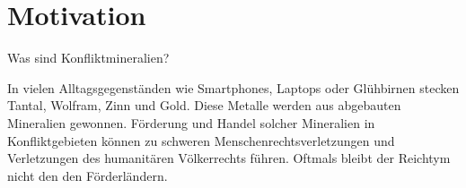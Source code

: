 \section{Motivation}\label{sec:motivation}

Was sind Konfliktmineralien?

In vielen Alltagsgegenständen wie Smartphones, Laptops oder Glühbirnen stecken Tantal, Wolfram, Zinn und Gold. Diese Metalle werden aus abgebauten Mineralien gewonnen. Förderung und Handel solcher Mineralien in Konfliktgebieten können zu schweren Menschenrechtsverletzungen und Verletzungen des humanitären Völkerrechts führen. Oftmals bleibt der Reichtym nicht den den Förderländern.
~\cite{definiti26:online}
